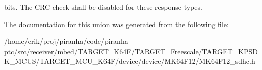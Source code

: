 bits. The C\+RC check shall be disabled for these response types. 

The documentation for this union was generated from the following file\+:\begin{DoxyCompactItemize}
\item 
/home/erik/proj/piranha/code/piranha-\/ptc/src/receiver/mbed/\+T\+A\+R\+G\+E\+T\+\_\+\+K64\+F/\+T\+A\+R\+G\+E\+T\+\_\+\+Freescale/\+T\+A\+R\+G\+E\+T\+\_\+\+K\+P\+S\+D\+K\+\_\+\+M\+C\+U\+S/\+T\+A\+R\+G\+E\+T\+\_\+\+M\+C\+U\+\_\+\+K64\+F/device/device/\+M\+K64\+F12/M\+K64\+F12\+\_\+sdhc.\+h\end{DoxyCompactItemize}
